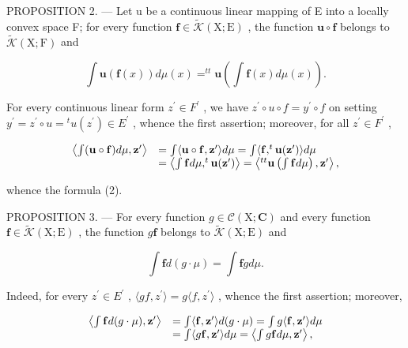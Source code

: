 PROPOSITION 2. --- Let u be a continuous linear mapping of E into a locally convex space F; for every function \(\mathbf{f} \in \widetilde{\mathcal{K}}(\mathrm{X};\mathrm{E})\) , the function \(\mathbf{u} \circ \mathbf{f}\) belongs to \(\widetilde{\mathcal{K}}(\mathrm{X};\mathrm{F})\) and

\[
\int \mathbf {u} (\mathbf {f} (x)) d \mu (x) = ^ {t t} \mathbf {u} \left(\int \mathbf {f} (x) d \mu (x)\right).\tag{2}
\]

For every continuous linear form \(z^{\prime} \in F^{\prime}\) , we have \(z^{\prime} \circ u \circ f = y^{\prime} \circ f\) on setting \(y^{\prime} = z^{\prime} \circ u = {}^{t}u(z^{\prime}) \in E^{\prime}\) , whence the first assertion; moreover, for all \(z^{\prime} \in F^{\prime}\) ,

\[
\begin{array}{r l} \left\langle \int (\mathbf {u} \circ \mathbf {f}) d \mu , \mathbf {z} ^ {\prime} \right\rangle & = \int \langle \mathbf {u} \circ \mathbf {f}, \mathbf {z} ^ {\prime} \rangle d \mu = \int \langle \mathbf {f}, ^ {t} \mathbf {u} (\mathbf {z} ^ {\prime}) \rangle d \mu \\ & = \left\langle \int \mathbf {f} d \mu , ^ {t} \mathbf {u} (\mathbf {z} ^ {\prime}) \right\rangle = \left\langle {} ^ {t t} \mathbf {u} \left(\int \mathbf {f} d \mu\right), \mathbf {z} ^ {\prime} \right\rangle , \end{array}
\]

whence the formula (2).

PROPOSITION 3. --- For every function \(g \in \mathcal{C}(\mathrm{X};\mathbf{C})\) and every function \(\mathbf{f} \in \widetilde{\mathcal{K}}(\mathrm{X};\mathrm{E})\) , the function \(g\mathbf{f}\) belongs to \(\widetilde{\mathcal{K}}(\mathrm{X};\mathrm{E})\) and

\[
\int \mathbf {f} d (g \cdot \mu) = \int \mathbf {f} g d \mu .\tag{3}
\]

Indeed, for every \(z^{\prime} \in E^{\prime}\) , \(\langle gf, z^{\prime} \rangle = g\langle f, z^{\prime} \rangle\) , whence the first assertion; moreover,

\[
\begin{array}{r l} \left\langle \int \mathbf {f} d (g \cdot \mu), \mathbf {z} ^ {\prime} \right\rangle & = \int \langle \mathbf {f}, \mathbf {z} ^ {\prime} \rangle d (g \cdot \mu) = \int g \langle \mathbf {f}, \mathbf {z} ^ {\prime} \rangle d \mu \\ & = \int \langle g \mathbf {f}, \mathbf {z} ^ {\prime} \rangle d \mu = \left\langle \int g \mathbf {f} d \mu , \mathbf {z} ^ {\prime} \right\rangle , \end{array}
\]

